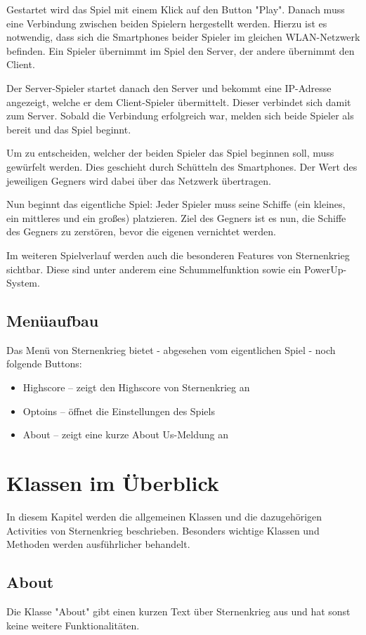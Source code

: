 \documentclass[11pt]{article} %
\begin{document}
Gestartet wird das Spiel mit einem Klick auf den Button "Play". Danach muss eine Verbindung zwischen beiden Spielern hergestellt werden. Hierzu ist es notwendig, dass sich die Smartphones beider Spieler im gleichen WLAN-Netzwerk befinden. Ein Spieler übernimmt im Spiel den Server, der andere übernimmt den Client.

Der Server-Spieler startet danach den Server und bekommt eine IP-Adresse angezeigt, welche er dem Client-Spieler übermittelt. Dieser verbindet sich damit zum Server. Sobald die Verbindung erfolgreich war, melden sich beide Spieler als bereit und das Spiel beginnt.

Um zu entscheiden, welcher der beiden Spieler das Spiel beginnen soll, muss gewürfelt werden. Dies geschieht durch Schütteln des Smartphones. Der Wert des jeweiligen Gegners wird dabei über das Netzwerk übertragen.

Nun beginnt das eigentliche Spiel: Jeder Spieler muss seine Schiffe (ein kleines, ein mittleres und ein großes) platzieren. Ziel des Gegners ist es nun, die Schiffe des Gegners zu zerstören, bevor die eigenen vernichtet werden.

Im weiteren Spielverlauf werden auch die besonderen Features von Sternenkrieg sichtbar. Diese sind unter anderem eine Schummelfunktion sowie ein PowerUp-System.

\subsection{Menüaufbau}
Das Menü von Sternenkrieg bietet - abgesehen vom eigentlichen Spiel - noch folgende Buttons:
\begin{itemize}
\item Highscore -- zeigt den Highscore von Sternenkrieg an
\item Optoins -- öffnet die Einstellungen des Spiels
\item About -- zeigt eine kurze About Us-Meldung an
\end{itemize}


\section{Klassen im Überblick}
In diesem Kapitel werden die allgemeinen Klassen und die dazugehörigen Activities von Sternenkrieg beschrieben. Besonders wichtige Klassen und Methoden werden ausführlicher behandelt.

\subsection{About}
Die Klasse "About" gibt einen kurzen Text über Sternenkrieg aus und hat sonst keine weitere Funktionalitäten.
\end{document}
